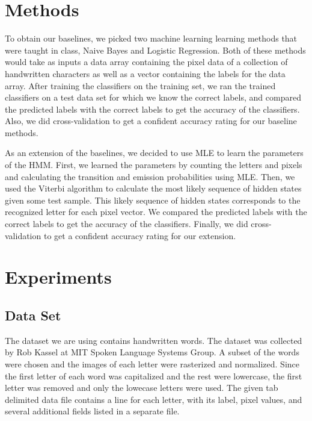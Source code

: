 \documentclass{article} %
\begin{document}
\section{Methods}
To obtain our baselines, we picked two machine learning learning methods that were taught in class, Naive Bayes and Logistic Regression. Both of these methods would take as inputs a data array containing the pixel data of a collection of handwritten characters as well as a vector containing the labels for the data array. After training the classifiers on the training set, we ran the trained classifiers on a test data set for which we know the correct labels, and compared the predicted labels with the correct labels to get the accuracy of the classifiers. Also, we did cross-validation to get a confident accuracy rating for our baseline methods. 

As an extension of the baselines, we decided to use MLE to learn the parameters of the HMM. First, we learned the parameters by counting the letters and pixels and calculating the transition and emission probabilities using MLE. Then, we used the Viterbi algorithm to calculate the most likely sequence of hidden states given some test sample. This likely sequence of hidden states corresponds to the recognized letter for each pixel vector. We compared the predicted labels with the correct labels to get the accuracy of the classifiers. Finally, we did cross-validation to get a confident accuracy rating for our extension. 

\section{Experiments}
\subsection{Data Set}
The dataset we are using contains handwritten words. The dataset was collected by Rob Kassel at MIT Spoken Language Systems Group. A subset of the words were chosen and the images of each letter were rasterized and normalized. Since the first letter of each word was capitalized and the rest were lowercase, the first letter was removed and only the lowecase letters were used. The given tab delimited data file  contains a line for each letter, with its label, pixel values, and several additional fields listed in a separate file. 
\end{document}
